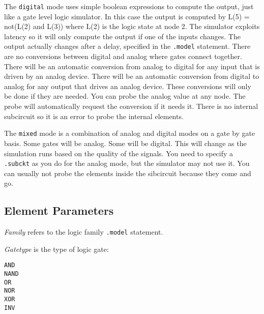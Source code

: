 The {\tt digital} mode uses simple boolean expressions to compute the
output, just like a gate level logic simulator.  In this case the output is
computed by L(5) = not(L(2) and L(3)) where L(2) is the logic state at node
2.  The simulator exploits latency so it will only compute the output if one
of the inputs changes.  The output actually changes after a delay, specified
in the {\tt .model} statement.  There are no conversions between digital and
analog where gates connect together.  There will be an automatic conversion
from analog to digital for any input that is driven by an analog device.
There will be an automatic conversion from digital to analog for any output
that drives an analog device.  These conversions will only be done if they
are needed.  You can probe the analog value at any node.  The probe will
automatically request the conversion if it needs it.  There is no internal
subcircuit so it is an error to probe the internal elements.

The {\tt mixed} mode is a combination of analog and digital modes on a gate
by gate basis.  Some gates will be analog.  Some will be digital.  This will
change as the simulation runs based on the quality of the signals.  You need
to specify a {\tt .subckt} as you do for the analog mode, but the simulator
may not use it.  You can usually not probe the elements inside the
sibcircuit because they come and go.
\subsection{Element Parameters}

{\em Family} refers to the logic family {\tt .model} statement.

{\em Gatetype} is the type of logic gate:

\begin{description}

\item[{\tt AND}]

\item[{\tt NAND}]

\item[{\tt OR}]

\item[{\tt NOR}]

\item[{\tt XOR}]

\item[{\tt INV}]

\end{description}

